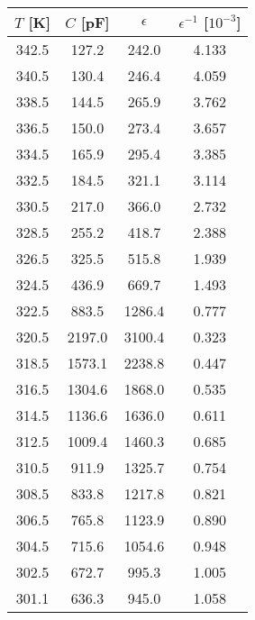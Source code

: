            \begin{tabular}{|c|c|c|c|}
                \hline
                $T$ [K] & $C$ [pF] & $\epsilon$ & $\epsilon^{-1}$ [$10^{-3}$] \\ \hline
                342.5 & 127.2 & 242.0 & 4.133\\
                340.5 & 130.4 & 246.4 & 4.059\\
                338.5 & 144.5 & 265.9 & 3.762\\
                336.5 & 150.0 & 273.4 & 3.657\\
                334.5 & 165.9 & 295.4 & 3.385\\
                332.5 & 184.5 & 321.1 & 3.114\\
                330.5 & 217.0 & 366.0 & 2.732\\
                328.5 & 255.2 & 418.7 & 2.388\\
                326.5 & 325.5 & 515.8 & 1.939\\
                324.5 & 436.9 & 669.7 & 1.493\\
                322.5 & 883.5 & 1286.4 & 0.777\\
                320.5 & 2197.0 & 3100.4 & 0.323\\
                318.5 & 1573.1 & 2238.8 & 0.447\\
                316.5 & 1304.6 & 1868.0 & 0.535\\
                314.5 & 1136.6 & 1636.0 & 0.611\\
                312.5 & 1009.4 & 1460.3 & 0.685\\
                310.5 & 911.9 & 1325.7 & 0.754\\
                308.5 & 833.8 & 1217.8 & 0.821\\
                306.5 & 765.8 & 1123.9 & 0.890\\
                304.5 & 715.6 & 1054.6 & 0.948\\
                302.5 & 672.7 & 995.3 & 1.005\\
                301.1 & 636.3 & 945.0 & 1.058\\
                \hline
            \end{tabular}
